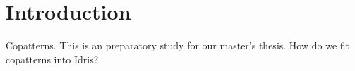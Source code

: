 \section{Introduction}
\label{sec:introduction}
Copatterns. This is an preparatory study for our master's thesis.
How do we fit copatterns into Idris?